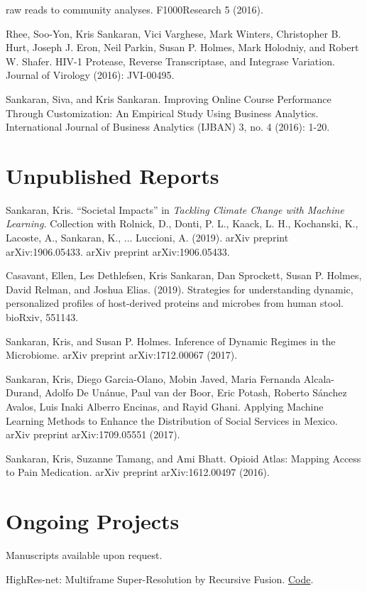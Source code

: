 \documentclass[letterpaper]{article}
\renewenvironment{itemize}{
  \begin{list}{}{
    \setlength{\leftmargin}{1.5em}
  }
}{
  \end{list}
}
\begin{document}
\begin{itemize}
\begin{itemize}
    raw reads to community analyses. F1000Research 5 (2016).
  \item Rhee, Soo-Yon, Kris Sankaran, Vici Varghese, Mark Winters, Christopher B.
    Hurt, Joseph J. Eron, Neil Parkin, Susan P. Holmes, Mark Holodniy, and Robert
    W. Shafer. HIV-1 Protease, Reverse Transcriptase, and Integrase Variation.
    Journal of Virology (2016): JVI-00495.
  \item Sankaran, Siva, and Kris Sankaran. Improving Online Course Performance
    Through Customization: An Empirical Study Using Business Analytics.
    International Journal of Business Analytics (IJBAN) 3, no. 4 (2016): 1-20.
  \end{itemize}
\end{itemize}

\section*{Unpublished Reports}
\begin{itemize}
\item Sankaran, Kris. ``Societal Impacts'' in 
\textit{Tackling Climate Change with Machine Learning.} Collection with Rolnick, D., Donti, P. L., Kaack, L. H., Kochanski, K., Lacoste, A., Sankaran, K., ... Luccioni, A. (2019). arXiv preprint arXiv:1906.05433. arXiv preprint arXiv:1906.05433.
\item Casavant, Ellen, Les Dethlefsen, Kris Sankaran, Dan Sprockett, Susan P. Holmes, David Relman, and Joshua Elias. (2019). Strategies for understanding dynamic, personalized profiles of host-derived proteins and microbes from human stool. bioRxiv, 551143.
 \item Sankaran, Kris, and Susan P. Holmes. Inference of Dynamic Regimes in
   the Microbiome. arXiv preprint arXiv:1712.00067 (2017).
  \item Sankaran, Kris, Diego Garcia-Olano, Mobin Javed, Maria Fernanda
    Alcala-Durand, Adolfo De Unánue, Paul van der Boor, Eric Potash, Roberto
    S\'anchez Avalos, Luis Inaki Alberro Encinas, and Rayid Ghani. Applying
    Machine Learning Methods to Enhance the Distribution of Social Services in
    Mexico. arXiv preprint arXiv:1709.05551 (2017).
  \item Sankaran, Kris, Suzanne Tamang, and Ami Bhatt. Opioid Atlas: Mapping
    Access to Pain Medication. arXiv preprint arXiv:1612.00497 (2016).
\end{itemize}

\section*{Ongoing Projects}
Manuscripts available upon request.
\begin{itemize}
\item HighRes-net: Multiframe Super-Resolution by Recursive Fusion.  
\href{https://github.com/ElementAI/HighRes-net}{Code}.
\end{itemize}
\end{document}
